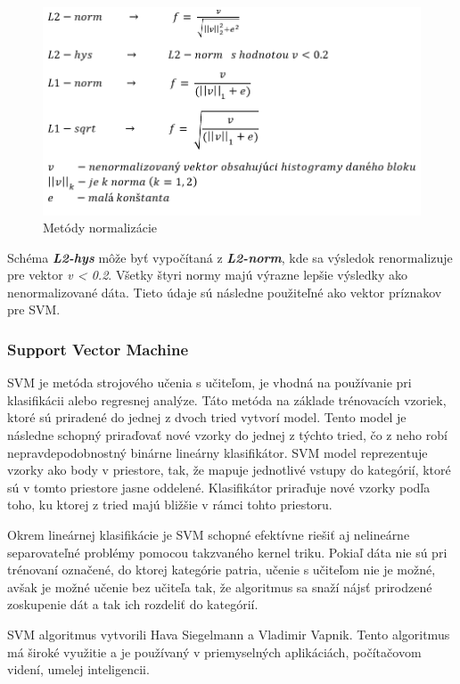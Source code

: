 \begin{figure}[!htbp]
  \centering
  \includegraphics[width=14cm]{img/HOGnorm.png}
  \caption{Metódy normalizácie}
  \label{HOGnorm}
\end{figure}

Schéma \textbf{\textit{L2-hys}} môže byť vypočítaná z \textbf{\textit{L2-norm}}, kde sa výsledok renormalizuje pre vektor \textit{v < 0.2}. Všetky štyri normy majú výrazne lepšie výsledky ako nenormalizované dáta. Tieto údaje sú následne použiteľné ako vektor príznakov pre SVM. \cite{c11}

\subsubsection{Support Vector Machine}
SVM je metóda strojového učenia s učiteľom, je vhodná na používanie pri klasifikácii alebo regresnej analýze. Táto metóda na základe trénovacích vzoriek, ktoré sú priradené do jednej z dvoch tried vytvorí model. Tento model je následne schopný priraďovať nové vzorky do jednej z týchto tried, čo z neho robí nepravdepodobnostný binárne lineárny klasifikátor. SVM model reprezentuje vzorky ako body v priestore, tak, že mapuje jednotlivé vstupy do kategórií, ktoré sú v tomto priestore jasne oddelené. Klasifikátor priraďuje nové vzorky podľa toho, ku ktorej z tried majú bližšie v rámci tohto priestoru.

Okrem lineárnej klasifikácie je SVM schopné efektívne riešiť aj nelineárne separovateľné problémy pomocou takzvaného kernel triku. Pokiaľ dáta nie sú pri trénovaní označené, do ktorej kategórie patria, učenie s učiteľom nie je možné, avšak je možné učenie bez učiteľa tak, že algoritmus sa snaží nájsť prirodzené zoskupenie dát a tak ich rozdeliť do kategórií.

SVM algoritmus vytvorili Hava Siegelmann a Vladimir Vapnik. Tento algoritmus má široké využitie a je používaný v priemyselných aplikáciách, počítačovom videní, umelej inteligencii.  \cite{c7}

